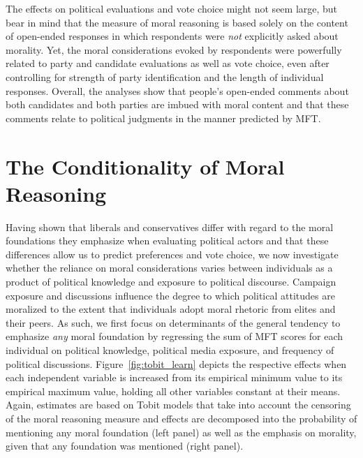 \documentclass[12pt]{article}
\begin{document}
The effects on political evaluations and vote choice might not seem large, but bear in mind that the measure of moral reasoning is based solely on the content of open-ended responses in which respondents were \textit{not} explicitly asked about morality. Yet, the moral considerations evoked by respondents were powerfully related to party and candidate evaluations as well as vote choice, even after controlling for strength of party identification and the length of individual responses. Overall, the analyses show that people's open-ended comments about both candidates and both parties are imbued with moral content and that these comments relate to political judgments in the manner predicted by MFT.


\section*{The Conditionality of Moral Reasoning}

Having shown that liberals and conservatives differ with regard to the moral foundations they emphasize when evaluating political actors and that these differences allow us to predict preferences and vote choice, we now investigate whether the reliance on moral considerations varies between individuals as a product of political knowledge and exposure to political discourse. Campaign exposure and discussions influence the degree to which political attitudes are moralized to the extent that individuals adopt moral rhetoric from elites and their peers. As such, we first focus on determinants of the general tendency to emphasize \textit{any} moral foundation by regressing the sum of MFT scores for each individual on political knowledge, political media exposure, and frequency of political discussions. Figure~\ref{fig:tobit_learn} depicts the respective effects when each independent variable is increased from its empirical minimum value to its empirical maximum value, holding all other variables constant at their means. Again, estimates are based on Tobit models that take into account the censoring of the moral reasoning measure and effects are decomposed into the probability of mentioning any moral foundation (left panel) as well as the emphasis on morality, given that any foundation was mentioned (right panel).
\end{document}
